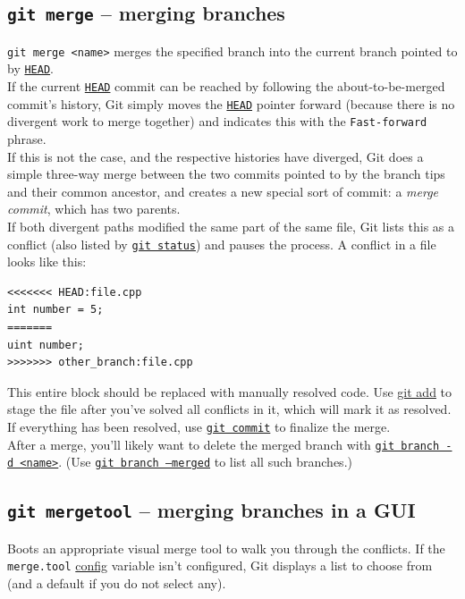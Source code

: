 \documentclass[table, xcdraw]{article}%
\begin{document}
\subsection{\texttt{git merge} -- merging branches} \label{merge}

\texttt{git merge <name>} merges the specified branch into the current branch pointed to by \hyperref[branching]{\texttt{HEAD}}.\\
If the current \hyperref[branching]{\texttt{HEAD}} commit can be reached by following the about-to-be-merged commit’s history, Git simply moves the \hyperref[branching]{\texttt{HEAD}} pointer forward (because there is no divergent work to merge together) and indicates this with the \texttt{Fast-forward} phrase.\\
If this is not the case, and the respective histories have diverged, Git does a simple three-way merge between the two commits pointed to by the branch tips and their common ancestor, and creates a new special sort of commit: a \emph{merge commit}, which has two parents.\\
If both divergent paths modified the same part of the same file, Git lists this as a conflict (also listed by \hyperref[status]{\texttt{git status}}) and pauses the process. A conflict in a file looks like this:

\begin{verbatim}
<<<<<<< HEAD:file.cpp
int number = 5;
=======
uint number;
>>>>>>> other_branch:file.cpp
\end{verbatim}

This entire block should be replaced with manually resolved code. Use \hyperref[add]{git add} to stage the file after you've solved all conflicts in it, which will mark it as resolved. If everything has been resolved, use \hyperref[commit]{\texttt{git commit}} to finalize the merge.\\
After a merge, you'll likely want to delete the merged branch with \hyperref[branch]{\texttt{git branch -d <name>}}. (Use \hyperref[merge]{\texttt{git branch --merged}} to list all such branches.)

\subsection{\texttt{git mergetool} -- merging branches in a GUI} \label{mergetool}

Boots an appropriate visual merge tool to walk you through the conflicts. If the \texttt{merge.tool} \hyperref[config]{config} variable isn't configured, Git displays a list to choose from (and a default if you do not select any).
\end{document}
